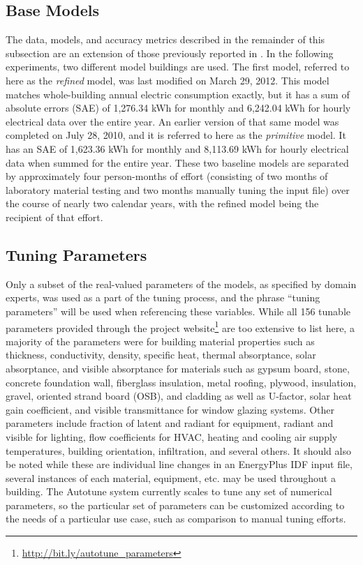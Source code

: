 \documentclass[preprint, review, 12pt]{elsarticle}
\begin{document}
\subsection{Base Models}
The data, models, and accuracy metrics described in the remainder of this subsection are an extension of those previously reported in \cite{cit:garrett2013}. In the following experiments, two different model buildings are used. The first model, referred to here as the \emph{refined} model, was last modified on March 29, 2012. This model matches whole-building annual electric consumption exactly, but it has a sum of absolute errors (SAE) of 1,276.34 kWh for monthly and 6,242.04 kWh for hourly electrical data over the entire year. An earlier version of that same model was completed on July 28, 2010, and it is referred to here as the \emph{primitive} model. It has an SAE of 1,623.36 kWh for monthly and 8,113.69 kWh for hourly electrical data when summed for the entire year. These two baseline models are separated by approximately four person-months of effort (consisting of two months of laboratory material testing and two months manually tuning the input file) over the course of nearly two calendar years, with the refined model being the recipient of that effort.

\subsection{Tuning Parameters}
Only a subset of the real-valued parameters of the models, as specified by domain experts, was used as a part of the tuning process, and the phrase ``tuning parameters'' will be used when referencing these variables. While all 156 tunable parameters provided through the project website\footnote{\url{http://bit.ly/autotune_parameters}} are too extensive to list here, a majority of the parameters were for building material properties such as thickness, conductivity, density, specific heat, thermal absorptance, solar absorptance, and visible absorptance for materials such as gypsum board, stone, concrete foundation wall, fiberglass insulation, metal roofing, plywood, insulation, gravel, oriented strand board (OSB), and cladding as well as U-factor, solar heat gain coefficient, and visible transmittance for window glazing systems. Other parameters include fraction of latent and radiant for equipment, radiant and visible for lighting, flow coefficients for HVAC, heating and cooling air supply temperatures, building orientation, infiltration, and several others. It should also be noted while these are individual line changes in an EnergyPlus IDF input file, several instances of each material, equipment, etc. may be used throughout a building. The Autotune system currently scales to tune any set of numerical parameters, so the particular set of parameters can be customized according to the needs of a particular use case, such as comparison to manual tuning efforts. 
\end{document}
